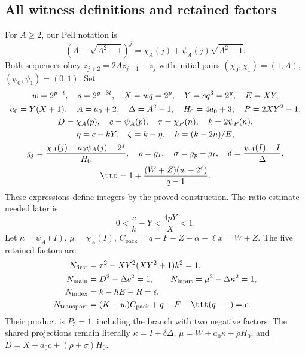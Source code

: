 \documentclass[11pt,letterpaper]{article}
\theoremstyle{definition}\newtheorem{definition}[theorem]{Definition}
\theoremstyle{remark}\newtheorem{remark}[theorem]{Remark}
\newcommand{\D}{\Delta}
\newcommand{\ch}[2]{\chi_{#1}(#2)}\newcommand{\ps}[2]{\psi_{#1}(#2)}
\begin{document}
\subsection{All witness definitions and retained factors}
For $A\ge2$, our Pell notation is
\begin{equation}\label{fup:eh:eq:pell}
 (A+\sqrt{A^2-1})^j=\ch A j+\ps A j\sqrt{A^2-1}.
\end{equation}
Both sequences obey $z_{j+2}=2Az_{j+1}-z_j$ with initial pairs
$(\chi_0,\chi_1)=(1,A)$, $(\psi_0,\psi_1)=(0,1)$.
Set
\begin{gather*}
 w=2^{p-t},\quad s=2^{y-3t},\quad X=wq=2^p,\quad Y=sq^3=2^y,\quad E=XY,\\
 a_0=Y(X+1),\quad A=a_0+2,\quad \D=A^2-1,\quad H_0=4a_0+3,\quad P=2XY^2+1,\\
 D=\ch A p,\quad c=\ps A p,\quad \tau=\ch P n,\quad k=2\ps P n,\\
 \eta=c-kY,\quad \zeta=k-\eta,\quad h=(k-2n)/E,\\
 g_j=\frac{\ch A j-a_0\ps A j-2^j}{H_0},\quad
 \rho=g_I,\quad \sigma=g_p-g_I,\quad \delta=\frac{\ps A I-I}{\D},\\
 \ttt=1+\frac{(W+Z)(w-2^e)}{q-1}.
\end{gather*}
These expressions define integers by the proved construction.
The ratio estimate needed later is
\begin{equation}\label{fup:eh:eq:ratio}
 0<\frac c k-Y<\frac{4pY}{X}<1.
\end{equation}
Let $\kappa=\ps A I$, $\mu=\ch A I$,
$C_{\mathrm{pack}}=q-F-Z-\alpha-\ell x=W+Z$. The five retained factors are
\begin{align*}
 N_{\mathrm{first}}&=\tau^2-XY^2(XY^2+1)k^2=1,\\
 N_{\mathrm{main}}&=D^2-\D c^2=1,\qquad
 N_{\mathrm{input}}=\mu^2-\D\kappa^2=1,\\
 N_{\mathrm{index}}&=k-hE-R=\epsilon,\\
 N_{\mathrm{transport}}&=(K+w)C_{\mathrm{pack}}+q-F-\ttt(q-1)=\epsilon.
\end{align*}
Their product is $P_5=1$, including the branch with two negative factors.
The shared projections remain literally
$\kappa=I+\delta\D$, $\mu=W+a_0\kappa+\rho H_0$, and
$D=X+a_0c+(\rho+\sigma)H_0$.
\end{document}
